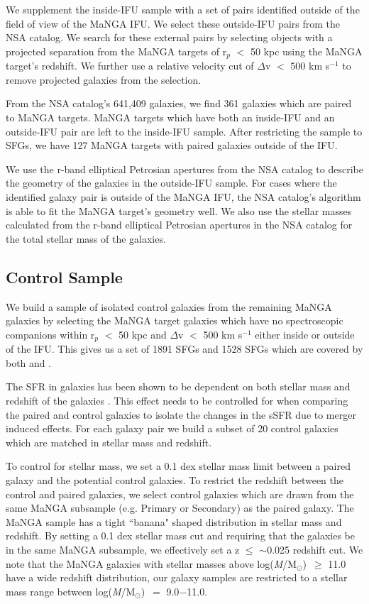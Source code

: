 \documentclass[iop,revtex4,twocolumn,apj,numberedappendix,appendixfloats]{emulateapj}
\newcommand{\logm}{log({\it M}/M$_{\odot}$)}
\begin{document}
We supplement the inside-IFU sample with a set of pairs identified outside of the field of view of the MaNGA IFU. We select these outside-IFU pairs from the NSA catalog. We search for these external pairs by selecting objects with a projected separation from the MaNGA targets of r$_p$ $<$ 50 kpc using the MaNGA target's redshift. We further use a relative velocity cut of $\Delta$v $<$ 500 km s$^{-1}$ to remove projected galaxies from the selection. 

From the NSA catalog's 641,409 galaxies, we find 361 galaxies which are paired to MaNGA targets. MaNGA targets which have both an inside-IFU and an outside-IFU pair are left to the inside-IFU sample. After restricting the sample to SFGs, we have 127 MaNGA targets with paired galaxies outside of the IFU. 

We use the r-band elliptical Petrosian apertures from the NSA catalog to describe the geometry of the galaxies in the outside-IFU sample. For cases where the identified galaxy pair is outside of the MaNGA IFU, the NSA catalog's algorithm is able to fit the MaNGA target's geometry well. We also use the stellar masses calculated from the r-band elliptical Petrosian apertures in the NSA catalog for the total stellar mass of the galaxies. 

\subsection{Control Sample}\label{sec:control}
We build a sample of isolated control galaxies from the remaining MaNGA galaxies by selecting the MaNGA target galaxies which have no spectroscopic companions within r$_p$ $<$ 50 kpc and $\Delta$v $<$ 500 km s$^{-1}$ either inside or outside of the IFU. This gives us a set of 1891 SFGs and 1528 SFGs which are covered by both \citet{Simard:2011} and \citet{Mendel:2014}. 

The SFR in galaxies has been shown to be dependent on both stellar mass and redshift of the galaxies \citep{Noeske:2007}. This effect needs to be controlled for when comparing the paired and control galaxies to isolate the changes in the sSFR due to merger induced effects. For each galaxy pair we build a subset of 20 control galaxies which are matched in stellar mass and redshift. 

To control for stellar mass, we set a 0.1 dex stellar mass limit between a paired galaxy and the potential control galaxies. To restrict the redshift between the control and paired galaxies, we select control galaxies which are drawn from the same MaNGA subsample (e.g. Primary or Secondary) as the paired galaxy. The MaNGA sample has a tight ``banana" shaped distribution in stellar mass and redshift. By setting a 0.1 dex stellar mass cut and requiring that the galaxies be in the same MaNGA subsample, we effectively set a z $\le$ $\sim$0.025 redshift cut. We note that the MaNGA galaxies with stellar masses above \logm\ $\ge$ 11.0 have a wide redshift distribution, our galaxy samples are restricted to a stellar mass range between \logm\ $=$ 9.0$-$11.0.
\end{document}
